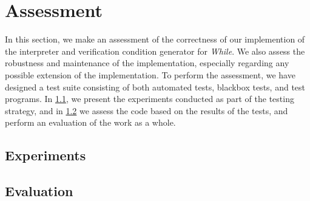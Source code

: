 \section{Assessment}\label{sec:assessment}
In this section, we make an assessment of the correctness of our implemention of the interpreter and verification condition generator for \textit{While}.
We also assess the robustness and maintenance of the implementation, especially regarding any possible extension of the implementation.
To perform the assessment, we have designed a test suite consisting of both automated tests, blackbox tests, and test programs.
In \cref{sec:experiments}, we present the experiments conducted as part of the testing strategy, and in \cref{sec:evaluation} we assess the code based on the results of the tests, and perform an evaluation of the work as a whole.

\subsection{Experiments}\label{sec:experiments}


\subsection{Evaluation}\label{sec:evaluation}

